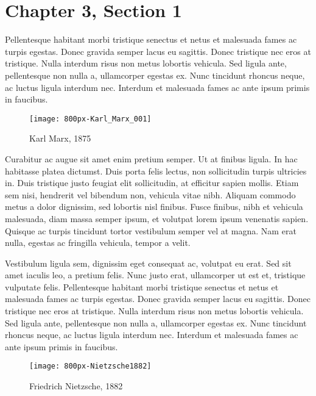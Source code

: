 \section{Chapter 3, Section 1}

Pellentesque habitant morbi tristique senectus et netus et malesuada fames ac turpis egestas. Donec gravida semper lacus eu sagittis. Donec tristique nec eros at tristique. Nulla interdum risus non metus lobortis vehicula. Sed ligula ante, pellentesque non nulla a, ullamcorper egestas ex. Nunc tincidunt rhoncus neque, ac luctus ligula interdum nec. Interdum et malesuada fames ac ante ipsum primis in faucibus.

\begin{wrapfigure}{r}{0.3\textwidth} %
    \centering
    \texttt{[image: 800px-Karl\_Marx\_001]}
    \caption{Karl Marx, 1875} \parencite{wiki:001}
\end{wrapfigure}
 
Curabitur ac augue sit amet enim pretium semper. Ut at finibus ligula. In hac habitasse platea dictumst. Duis porta felis lectus, non sollicitudin turpis ultricies in. Duis tristique justo feugiat elit sollicitudin, at efficitur sapien mollis. Etiam sem nisi, hendrerit vel bibendum non, vehicula vitae nibh. Aliquam commodo metus a dolor dignissim, sed lobortis nisl finibus. Fusce finibus, nibh et vehicula malesuada, diam massa semper ipsum, et volutpat lorem ipsum venenatis sapien. Quisque ac turpis tincidunt tortor vestibulum semper vel at magna. Nam erat nulla, egestas ac fringilla vehicula, tempor a velit.

Vestibulum ligula sem, dignissim eget consequat ac, volutpat eu erat. Sed sit amet iaculis leo, a pretium felis. Nunc justo erat, ullamcorper ut est et, tristique vulputate felis. Pellentesque habitant morbi tristique senectus et netus et malesuada fames ac turpis egestas. Donec gravida semper lacus eu sagittis. Donec tristique nec eros at tristique. Nulla interdum risus non metus lobortis vehicula. Sed ligula ante, pellentesque non nulla a, ullamcorper egestas ex. Nunc tincidunt rhoncus neque, ac luctus ligula interdum nec. Interdum et malesuada fames ac ante ipsum primis in faucibus.

\begin{wrapfigure}{l}{0.4\textwidth}
    \centering
    \texttt{[image: 800px-Nietzsche1882]}
\caption{Friedrich Nietzsche, 1882} \parencite{wiki:002}
\end{wrapfigure}

